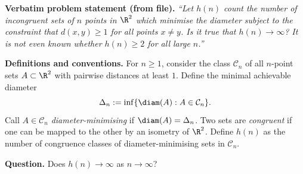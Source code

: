 \noindent\textbf{Verbatim problem statement (from file).}
\emph{``Let $h(n)$ count the number of incongruent sets of $n$ points in $\R^2$ which minimise the diameter subject to the constraint that $d(x,y)\ge 1$ for all points $x\ne y$. Is it true that $h(n)\to\infty$? It is not even known whether $h(n)\ge 2$ for all large $n$.''}

\medskip
\noindent\textbf{Definitions and conventions.}
For $n\ge 1$, consider the class $\mathcal{C}_n$ of all $n$-point sets $A\subset\R^2$ with pairwise distances at least $1$.
Define the minimal achievable diameter
\[\Delta_n := \inf\{\diam(A): A\in\mathcal{C}_n\}.
\]
Call $A\in\mathcal{C}_n$ \emph{diameter-minimising} if $\diam(A)=\Delta_n$.
Two sets are \emph{congruent} if one can be mapped to the other by an isometry of $\R^2$.
Define $h(n)$ as the number of congruence classes of diameter-minimising sets in $\mathcal{C}_n$.

\medskip
\noindent\textbf{Question.}
Does $h(n)\to\infty$ as $n\to\infty$?
